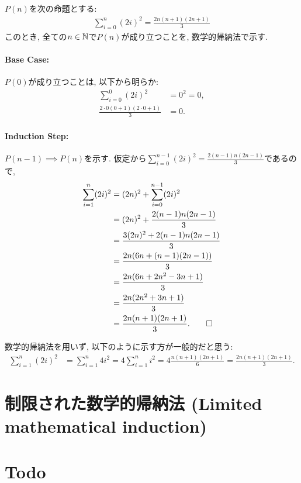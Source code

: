 \begin{proof*}
  $P(n)$を次の命題とする:
  \begin{align*}
    \sum_{i=0}^{n}(2i)^2=\frac{2n(n+1)(2n+1)}{3}
  \end{align*}
  このとき,
  全ての$n\in\mathbb{N}$で$P(n)$が成り立つことを,
  数学的帰納法で示す.

  \paragraph{Base Case:}
  $P(0)$が成り立つことは, 以下から明らか:
  \begin{align*}
    \sum_{i=0}^{0}(2i)^2&=0^2=0,\\
    \frac{2\cdot 0(0+1)(2\cdot 0+1)}{3}&=0.
  \end{align*}

  \paragraph{Induction Step:}
  $P(n-1)\implies P(n)$を示す.
  仮定から$\sum_{i=0}^{n-1}(2i)^2=\frac{2(n-1)n(2n-1)}{3}$であるので,
  \begin{align*}
    \sum_{i=1}^{n}(2i)^2&=(2n)^2+\sum_{i=0}^{n-1}(2i)^2\\
    &=(2n)^2+\frac{2(n-1)n(2n-1)}{3}\\
    &=\frac{3(2n)^2+2(n-1)n(2n-1)}{3}\\
    &=\frac{2n(6n+(n-1)(2n-1))}{3}\\
    &=\frac{2n(6n+2n^2-3n+1)}{3}\\
    &=\frac{2n(2n^2+3n+1)}{3}\\
    &=\frac{2n(n+1)(2n+1)}{3}
    .\qedhere
  \end{align*}
\end{proof*}


\begin{rem}
  数学的帰納法を用いず, 以下のように示す方が一般的だと思う:
  \begin{align*}
    \sum_{i=1}^{n}(2i)^2&=
    \sum_{i=1}^{n}4i^2=
    4\sum_{i=1}^{n}i^2=
    4\frac{n(n+1)(2n+1)}{6}=
    \frac{2n(n+1)(2n+1)}{3}.
  \end{align*}
\end{rem}

\section{制限された数学的帰納法 (Limited mathematical induction)}


\section{Todo}






